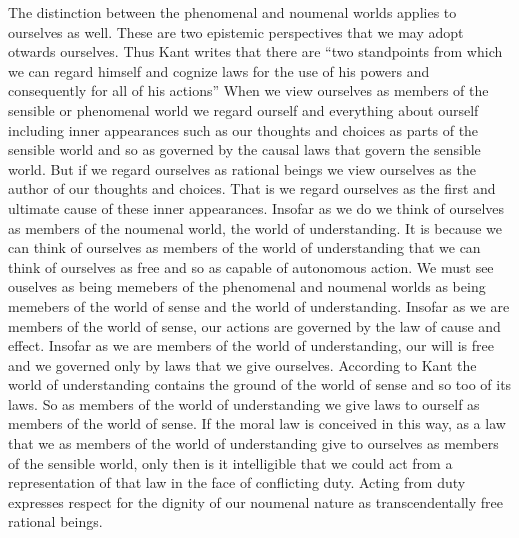 The distinction between the phenomenal and noumenal worlds applies to ourselves as well. These are two epistemic perspectives that we may adopt otwards ourselves. Thus Kant writes that there are ``two standpoints from which we can regard himself and cognize laws for the use of his powers and consequently for all of his actions'' When we view ourselves as members of the sensible or phenomenal world we regard ourself and everything about ourself including inner appearances such as our thoughts and choices as parts of the sensible world and so as governed by the causal laws that govern the sensible world. But if we regard ourselves as rational beings we view ourselves as the author of our thoughts and choices. That is we regard ourselves as the first and ultimate cause of these inner appearances. Insofar as we do we think of ourselves as members of the noumenal world, the world of understanding. It is because we can think of ourselves as members of the world of understanding that we can think of ourselves as free and so as capable of autonomous action. 
We must see ouselves as being memebers of the phenomenal and noumenal worlds as being memebers of the world of sense and the world of understanding. Insofar as we are members of the world of sense, our actions are governed by the law of cause and effect. Insofar as we are members of the world of understanding, our will is free and we governed only by laws that we give ourselves. According to Kant the world of understanding contains the ground of the world of sense and so too of its laws. So as members of the world of understanding we give laws to ourself as members of the world of sense. If the moral law is conceived in this way, as a law that we as members of the world of understanding give to ourselves as members of the sensible world, only then is it intelligible that we could act from a representation of that law in the face of conflicting duty. Acting from duty expresses respect for the dignity of our noumenal nature as transcendentally free rational beings.

